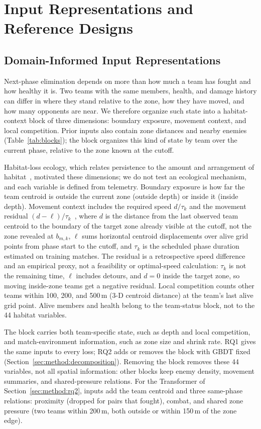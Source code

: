\documentclass[sigconf,anonymous,nonacm]{acmart}
\begin{document}
\section{Input Representations and Reference Designs}
\label{sec:method:design}
\subsection{Domain-Informed Input Representations}
\label{sec:method:representation}
Next-phase elimination depends on more than how much a team has fought and how healthy it is. Two teams with the same members, health, and damage history can differ in where they stand relative to the zone, how they have moved, and how many opponents are near. We therefore organize such state into a habitat-context block of three dimensions: boundary exposure, movement context, and local competition. Prior inputs also contain zone distances and nearby enemies (Table~\ref{tab:blocks}); the block organizes this kind of state by team over the current phase, relative to the zone known at the cutoff.

Habitat-loss ecology, which relates persistence to the amount and arrangement of habitat~\cite{Fahrig03}, motivated these dimensions; we do not test an ecological mechanism, and each variable is defined from telemetry. Boundary exposure is how far the team centroid is outside the current zone (outside depth) or inside it (inside depth). Movement context includes the required speed $d/\tau_k$ and the movement residual $(d-\ell)/\tau_k$~\cite{Nathan08}, where $d$ is the distance from the last observed team centroid to the boundary of the target zone already visible at the cutoff, not the zone revealed at $b_{m,k}$, $\ell$ sums horizontal centroid displacements over alive grid points from phase start to the cutoff, and $\tau_k$ is the scheduled phase duration estimated on training matches. The residual is a retrospective speed difference and an empirical proxy, not a feasibility or optimal-speed calculation: $\tau_k$ is not the remaining time, $\ell$ includes detours, and $d=0$ inside the target zone, so moving inside-zone teams get a negative residual. Local competition counts other teams within 100, 200, and 500\,m (3-D centroid distance) at the team's last alive grid point. Alive members and health belong to the team-status block, not to the 44 habitat variables.

The block carries both team-specific state, such as depth and local competition, and match-environment information, such as zone size and shrink rate. RQ1 gives the same inputs to every loss; RQ2 adds or removes the block with GBDT fixed (Section~\ref{sec:method:decomposition}). Removing the block removes these 44 variables, not all spatial information: other blocks keep enemy density, movement summaries, and shared-pressure relations. For the Transformer of Section~\ref{sec:method:rq2}, inputs add the team centroid and three same-phase relations: proximity (dropped for pairs that fought), combat, and shared zone pressure (two teams within 200\,m, both outside or within 150\,m of the zone edge).
\end{document}
